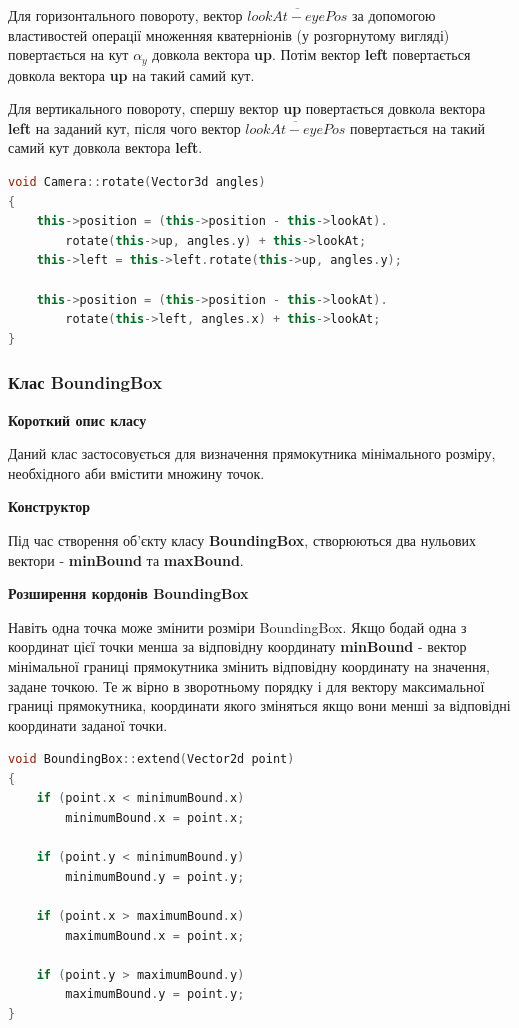 \documentclass[simple,a4paper,14pt,ukrainian,utf8]{eskdtext}
\begin{document}
        Для горизонтального повороту, вектор $\overline{lookAt - eyePos}$ за допомогою властивостей операції множенняя кватерніонів (у розгорнутому вигляді) повертається на кут $\alpha_y$ довкола вектора \textbf{up}. Потім вектор \textbf{left} повертається довкола вектора \textbf{up} на такий самий кут.
        
        Для вертикального повороту, спершу вектор \textbf{up} повертається довкола вектора \textbf{left} на заданий кут, після чого вектор $\overline{lookAt - eyePos}$ повертається на такий самий кут довкола вектора \textbf{left}. 
        
\begin{small}
\begin{lstlisting}[language=C++]
void Camera::rotate(Vector3d angles)
{
    this->position = (this->position - this->lookAt).
    	rotate(this->up, angles.y) + this->lookAt;
    this->left = this->left.rotate(this->up, angles.y);

    this->position = (this->position - this->lookAt).
    	rotate(this->left, angles.x) + this->lookAt;
}
\end{lstlisting}
\end{small}

	\subsubsection{Клас BoundingBox}
        
        \textbf{Короткий опис класу}
        
        Даний клас застосовується для визначення прямокутника мінімального розміру, необхідного аби вмістити множину точок.
        
        \textbf{Конструктор}
        
        Під час створення об’єкту класу \textbf{BoundingBox}, створюються два нульових вектори - \textbf{minBound} та \textbf{maxBound}.
        
        \textbf{Розширення кордонів BoundingBox}
        
        Навіть одна точка може змінити розміри BoundingBox. Якщо бодай одна з координат цієї точки менша за відповідну координату \textbf{minBound} - вектор мінімальної границі прямокутника змінить відповідну координату на значення, задане точкою. Те ж вірно в зворотньому порядку і для вектору максимальної границі прямокутника, координати якого зміняться якщо вони менші за відповідні координати заданої точки.
        
\begin{small}
\begin{lstlisting}[language=C++]
void BoundingBox::extend(Vector2d point)
{
    if (point.x < minimumBound.x)
        minimumBound.x = point.x;

    if (point.y < minimumBound.y)
        minimumBound.y = point.y;

    if (point.x > maximumBound.x)
        maximumBound.x = point.x;

    if (point.y > maximumBound.y)
        maximumBound.y = point.y;
}
\end{lstlisting}
\end{small}
        
\end{document}
